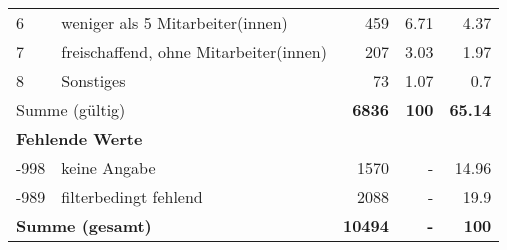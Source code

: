 \begin{longtable}{lXrrr}
     6 &
     \multicolumn{1}{X}{ weniger als 5 Mitarbeiter(innen)   } &


       \num{459} &
       \num[round-mode=places,round-precision=2]{6,71} &
         \num[round-mode=places,round-precision=2]{4,37} \\

     7 &
     \multicolumn{1}{X}{ freischaffend, ohne Mitarbeiter(innen)   } &


       \num{207} &
       \num[round-mode=places,round-precision=2]{3,03} &
         \num[round-mode=places,round-precision=2]{1,97} \\

     8 &
     \multicolumn{1}{X}{ Sonstiges   } &


       \num{73} &
       \num[round-mode=places,round-precision=2]{1,07} &
         \num[round-mode=places,round-precision=2]{0,7} \\
     \midrule
     \multicolumn{2}{l}{Summe (gültig)} &
       \textbf{\num{6836}} &
     \textbf{100} &
       \textbf{\num[round-mode=places,round-precision=2]{65,14}} \\
     \multicolumn{5}{l}{\textbf{Fehlende Werte}}\\
       -998 &
       keine Angabe &
         \num{1570} &
        - &
         \num[round-mode=places,round-precision=2]{14,96} \\
       -989 &
       filterbedingt fehlend &
         \num{2088} &
        - &
         \num[round-mode=places,round-precision=2]{19,9} \\
     \midrule
     \multicolumn{2}{l}{\textbf{Summe (gesamt)}} &
          \textbf{\num{10494}} &
        \textbf{-} &
        \textbf{100} \\
     \bottomrule
     \end{longtable}
     
